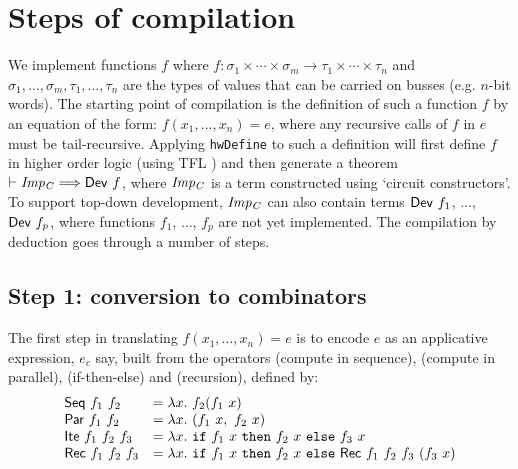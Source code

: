 \documentclass{llncs}
\begin{document}
\section{Steps of compilation}
\label{secImplementation}
We implement functions $f$ where
$f : \sigma_1\times\cdots\times\sigma_m \rightarrow \tau_1\times\cdots\times\tau_n$
and $\sigma_1,\ldots,\sigma_m,\tau_1,\ldots,\tau_n$ are the types of
values that can be carried on busses (e.g. $n$-bit words).
The starting point of compilation is the definition of such a function $f$ by an equation of
the form: $f(x_1,\ldots,x_n)=e$, where any recursive calls of $f$ in
$e$ must be tail-recursive. Applying \texttt{hwDefine} to such a
definition will first define $f$ in higher order logic (using TFL
\cite{slind:wfrec})  and then generate a theorem $\vdash {\it{Imp_C}}
\Longrightarrow \mathsf{Dev}~f$, where ${\it{Imp_C}}$ is a term
constructed using `circuit constructors'.
To support top-down development, ${\it{Imp_C}}$ can also contain terms
$\mathsf{Dev}~f_1$, $\ldots$, $\mathsf{Dev}~f_p$, where functions $f_1$,
$\ldots$, $f_p$ are not yet implemented. The compilation by deduction
goes through a number of steps.

\vspace*{-3mm}

\subsection*{Step 1: conversion to combinators}

The first step in translating $f(x_1,\ldots,x_n)=e$ is to encode $e$
as an applicative expression, $e_c$ say, built from the operators 
(compute in sequence),
 (compute in parallel),  (if-then-else) and  (recursion), defined by:
\[
\begin{array}{ll}
\mathsf{Seq}~f_1~f_2     &   = \lambda x.~f_2(f_1~x)\\
\mathsf{Par}~f_1~f_2     &   = \lambda x.~(f_1~x,~f_2~x)\\
\mathsf{Ite}~f_1~f_2~f_3 &   = \lambda x.~ \texttt{if}~f_1~x~\texttt{then}~f_2~x~\texttt{else}~f_3~x\\
\mathsf{Rec}~f_1~f_2~f_3 &   = \lambda x.~\texttt{if}~f_1~x~\texttt{then}~f_2~x~\texttt{else}~\mathsf{Rec}~f_1~f_2~f_3~(f_3~x)\\
\end{array}
\]
\end{document}
